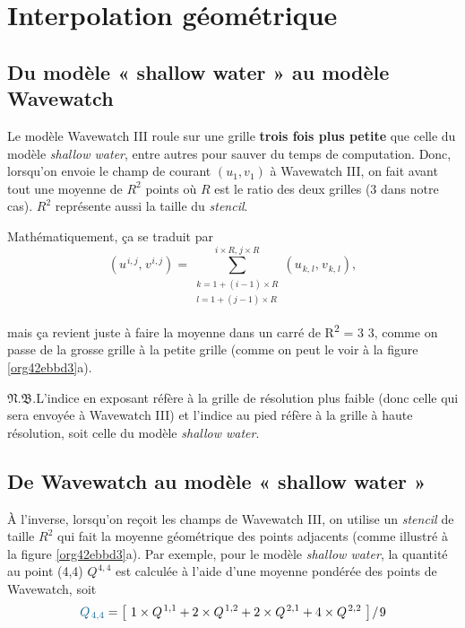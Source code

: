 \documentclass[10pt]{report}
\numberwithin{equation}{section}
\newcommand{\pt}{\hspace{1pt}} %
\newcommand{\nb}{\underline{{\footnotesize\EightStarConvex}\pt $\mathfrak{N.B.}$\vphantom{p}}\hspace{3pt}}
\begin{document}
\section{Interpolation géométrique}
\label{sec:org36565b6}

\subsection{Du modèle « shallow water » au modèle Wavewatch}
\label{sec:org9a5bd4f}

Le modèle Wavewatch III roule sur une grille \textbf{trois fois plus petite} que celle du modèle \emph{shallow water}, entre autres pour sauver du temps de computation.
Donc, lorsqu'on envoie le champ de courant \((u_1,v_1)\) à Wavewatch III, on fait avant tout une moyenne de \(R^2\) points où \(R\) est le ratio des deux grilles (3 dans notre cas).
\(R^2\) représente aussi la taille du \emph{stencil}.\bigskip

Mathématiquement, ça se traduit par
\begin{equation}
\label{eq:org54ce782}
   (u^{\pt i,j},\pt v^{\pt i,j}) =
   \sum_{\substack{k=1 + (i-1)\times R\\ l=1 + (j-1)\times R}}^{i\times R,\pt j\times R}
   (u_{\pt k,\pt l},\pt v_{\pt k,\pt l}),
\end{equation}

mais ça revient juste à faire la moyenne dans un carré de R\textsuperscript{2} = 3\texttimes{} 3, comme on passe de la grosse grille à la petite grille (comme on peut le voir à la figure \ref{org42ebbd3}a). \bigskip

\nb L'indice en exposant réfère à la grille de résolution plus faible (donc celle qui sera envoyée à Wavewatch III) et l'indice au pied réfère à la grille à haute résolution, soit celle du modèle \emph{shallow water}.
\subsection{De Wavewatch au modèle « shallow water »}
\label{sec:org085b7a3}

À l'inverse, lorsqu'on reçoit les champs de Wavewatch III,  on utilise un \emph{stencil} de taille \(R^2\) qui fait la moyenne géométrique des points adjacents (comme illustré à la figure \ref{org42ebbd3}a).
Par exemple, pour le modèle \emph{shallow water}, la quantité au point (4,4) \(Q^{\pt4,4}\) est calculée à l'aide d'une moyenne pondérée des points de Wavewatch, soit
\begin{equation}
   {\color{MidnightBlue} Q_{\pt4,4}} = \qty[\ 1\times Q^{\pt1,1}+ 2\times Q^{\pt1,2}+ 2\times Q^{\pt2,1}+ 4\times Q^{\pt2,2}\ ]\pt/\pt9
\end{equation}
\end{document}
